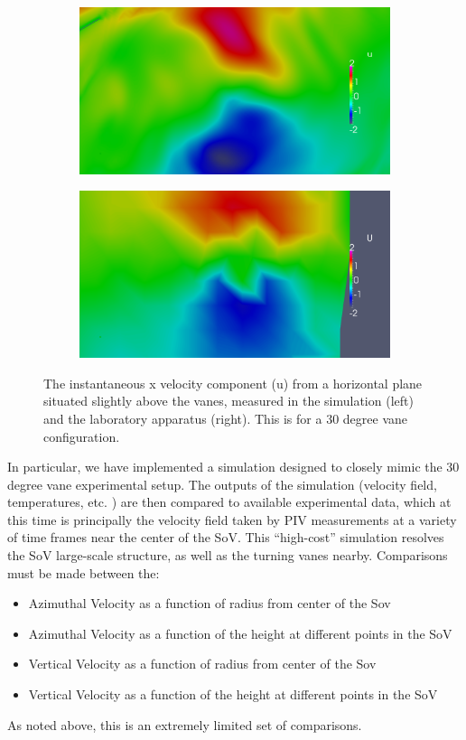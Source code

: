 \documentclass{article}
\begin{document}
\begin{figure}[!htb]
        \centering
        \begin{subfigure}[bh]{0.5\textwidth}
                \includegraphics[width=.8\linewidth]{figs/u_sim.png}
        \end{subfigure}%
        \begin{subfigure}[bh]{0.5\textwidth}
                \includegraphics[width=.8\linewidth]{figs/u_exp.png}
        \end{subfigure}
 \caption{The instantaneous x velocity component (u)
 from a horizontal plane situated slightly above the vanes,
 measured in the simulation (left) and the laboratory apparatus
 (right). This is for a 30 degree vane configuration.} 
 \label{fig:instant}
\end{figure}


In particular, we have implemented a simulation designed
to closely mimic the 30 degree vane experimental setup. The outputs of
the simulation (velocity field, temperatures, etc. ) are then compared
to available experimental data, which at this time is principally the
velocity field taken by PIV measurements at a variety of time frames
near the center of the SoV. This ``high-cost'' simulation resolves
the SoV large-scale structure, as well as the turning vanes
nearby. Comparisons must be made between the:
\begin{itemize}
 \item Azimuthal Velocity as a function of radius from center of the Sov
 \item Azimuthal Velocity as a function of the height at different
       points in the SoV
 \item Vertical Velocity as a function of radius from center of the Sov
 \item Vertical Velocity as a function of the height at different
       points in the SoV
\end{itemize}
As noted above, this is an extremely limited set of comparisons. 
\end{document}
